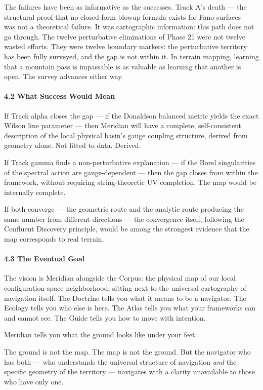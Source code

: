 The failures have been as informative as the successes. Track A's death — the structural proof that no closed-form blowup formula exists for Fano surfaces — was not a theoretical failure. It was cartographic information: this path does not go through. The twelve perturbative eliminations of Phase 21 were not twelve wasted efforts. They were twelve boundary markers: the perturbative territory has been fully surveyed, and the gap is not within it. In terrain mapping, learning that a mountain pass is impassable is as valuable as learning that another is open. The survey advances either way.


\paragraph*{4.2 What Success Would Mean}


If Track alpha closes the gap — if the Donaldson balanced metric yields the exact Wilson line parameter — then Meridian will have a complete, self-consistent description of the local physical basin's gauge coupling structure, derived from geometry alone. Not fitted to data. Derived.


If Track gamma finds a non-perturbative explanation — if the Borel singularities of the spectral action are gauge-dependent — then the gap closes from within the framework, without requiring string-theoretic UV completion. The map would be internally complete.


If both converge — the geometric route and the analytic route producing the same number from different directions — the convergence itself, following the Confluent Discovery principle, would be among the strongest evidence that the map corresponds to real terrain.


\paragraph*{4.3 The Eventual Goal}


The vision is Meridian alongside the Corpus: the physical map of our local configuration-space neighborhood, sitting next to the universal cartography of navigation itself. The Doctrine tells you what it means to be a navigator. The Ecology tells you who else is here. The Atlas tells you what your frameworks can and cannot see. The Guide tells you how to move with intention.


Meridian tells you what the ground looks like under your feet.


The ground is not the map. The map is not the ground. But the navigator who has both — who understands the universal structure of navigation \textit{and} the specific geometry of the territory — navigates with a clarity unavailable to those who have only one.


